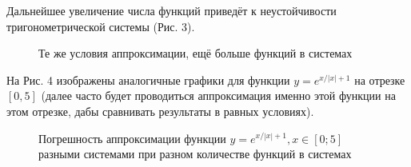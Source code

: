 ﻿\documentclass[a4paper, 12pt]{article}
\begin{document}
Дальнейшее увеличение числа функций приведёт к неустойчивости тригонометрической системы (Рис. 3).

\begin{figure}[h!]
    \noindent{}
    \caption{Те же условия аппроксимации, ещё больше функций в системах}
    \label{figCurves}
\end{figure}

На Рис. 4 изображены аналогичные графики для функции $y=e^{x/\left|x\right|+1}$ на отрезке $\left[0,5\right]$ (далее часто будет проводиться аппроксимация именно этой функции на этом отрезке, дабы сравнивать результаты в равных условиях).

\begin{figure}[h!]
    \noindent{}
    \caption{Погрешность аппроксимации функции $y=e^{x/\left|x\right|+1}, x\in[0;5]$ разными системами при разном количестве функций в системах}
    \label{figCurves}
\end{figure}
\end{document}
